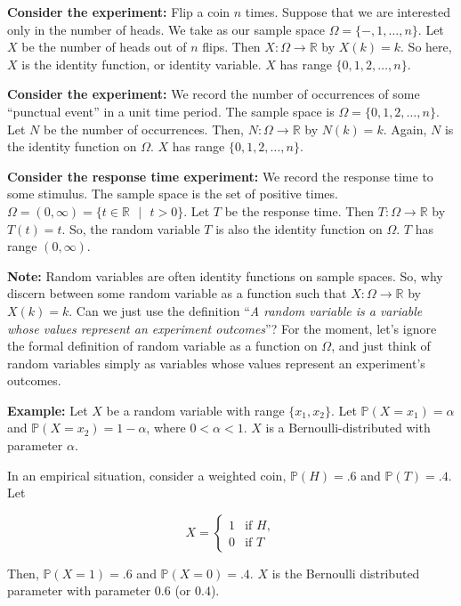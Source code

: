 \documentclass[12pt]{article}
\newcommand{\R}{\mathbb{R}}
\newcommand{\prob}[1]{\mathbb{P}(#1)}
\begin{document}
\begin{tcolorbox}
\textbf{Consider the experiment:} Flip a coin $n$ times. Suppose that we are interested only in the number of heads. We take as our sample space $\Omega = \{ -, 1, \ldots, n \}$. Let $X$ be the number of heads out of $n$ flips. Then $X : \Omega \rightarrow \R$ by $X(k) = k$. So here, $X$ is the identity function, or identity variable. $X$ has range $\{ 0, 1, 2, \ldots, n \}$.
\end{tcolorbox}

\begin{tcolorbox}
\textbf{Consider the experiment:} We record the number of occurrences of some ``punctual event'' in a unit time period. The sample space is $\Omega = \{ 0, 1, 2, \ldots, n \}$. Let $N$ be the number of occurrences. Then, $N : \Omega \rightarrow \R$ by $N(k) = k$. Again, $N$ is the identity function on $\Omega$. $X$ has range $\{ 0, 1, 2, \ldots, n \}$. 
\end{tcolorbox}

\begin{tcolorbox}
\textbf{Consider the response time experiment:} We record the response time to some stimulus. The sample space is the set of positive times. $\Omega = (0, \infty) = \{ t \in \R \text{ } \lvert \text{ } t > 0 \}$. Let $T$ be the response time. Then $T: \Omega \rightarrow \R$ by $T(t) = t$. So, the random variable $T$ is also the identity function on $\Omega$. $T$ has range $( 0, \infty )$.
\end{tcolorbox}

\noindent
\textbf{Note: } Random variables are often identity functions on sample spaces. So, why discern between some random variable as a function such that $X : \Omega \rightarrow \R$ by $X(k) = k$. Can we just use the definition ``\textit{A random variable is a variable whose values represent an experiment outcomes}''? For the moment, let's ignore the formal definition of random variable as a function on $\Omega$, and just think of random variables simply as variables whose values represent an experiment's outcomes.

\begin{tcolorbox}
\textbf{Example:} Let $X$ be a random variable with range $\{ x_1, x_2 \}$. Let $\prob{X = x_1} = \alpha$ and $\prob{X = x_2} = 1 - \alpha$, where $0 < \alpha < 1$. $X$ is a Bernoulli-distributed with parameter $\alpha$.

In an empirical situation, consider a weighted coin, $\prob{H} = .6$ and $\prob{T} = .4$. Let 

\begin{equation*}
X =  \begin{cases} 
      1 & \text{if } H, \\
      0 & \text{if } T
      \end{cases}
\end{equation*}

\noindent
Then, $\prob{X = 1} = .6$ and $\prob{X = 0} = .4$. $X$ is the Bernoulli distributed parameter with parameter $0.6$ (or $0.4$).
\end{tcolorbox}
\end{document}
